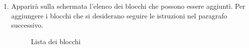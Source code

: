 \begin{enumerate}
\newpage
\item Apparirà sulla schermata l'elenco dei blocchi che possono essere aggiunti.
Per aggiungere i blocchi che si desiderano seguire le istruzioni nel paragrafo successivo.
\begin{figure}[!ht]
	\centering
	\caption{Lista dei blocchi}
\end{figure}

\end{enumerate}

